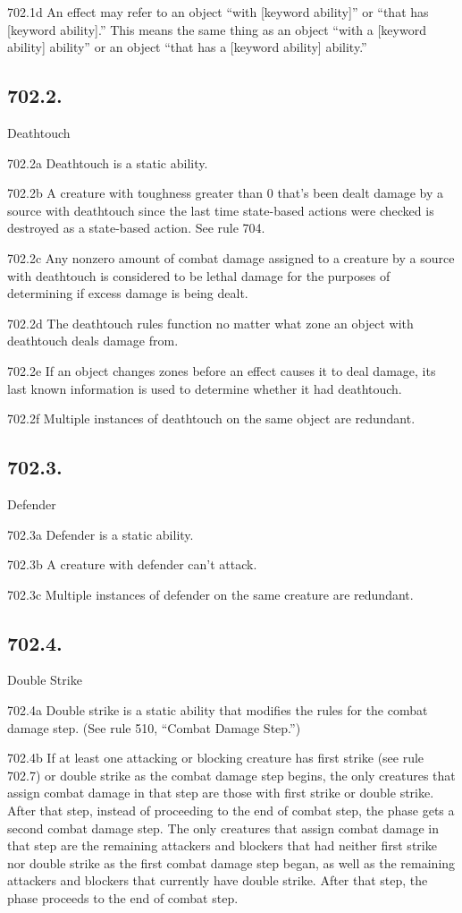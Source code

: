 702.1d An effect may refer to an object “with [keyword ability]” or “that has [keyword ability].” This means the same thing as an object “with a [keyword ability] ability” or an object “that has a [keyword ability] ability.”

\subsection*{702.2.}
Deathtouch

702.2a Deathtouch is a static ability.

702.2b A creature with toughness greater than 0 that’s been dealt damage by a source with deathtouch since the last time state-based actions were checked is destroyed as a state-based action. See rule 704.

702.2c Any nonzero amount of combat damage assigned to a creature by a source with deathtouch is considered to be lethal damage for the purposes of determining if excess damage is being dealt.

702.2d The deathtouch rules function no matter what zone an object with deathtouch deals damage from.

702.2e If an object changes zones before an effect causes it to deal damage, its last known information is used to determine whether it had deathtouch.

702.2f Multiple instances of deathtouch on the same object are redundant.

\subsection*{702.3.}
Defender

702.3a Defender is a static ability.

702.3b A creature with defender can’t attack.

702.3c Multiple instances of defender on the same creature are redundant.

\subsection*{702.4.}
Double Strike

702.4a Double strike is a static ability that modifies the rules for the combat damage step. (See rule 510, “Combat Damage Step.”)

702.4b If at least one attacking or blocking creature has first strike (see rule 702.7) or double strike as the combat damage step begins, the only creatures that assign combat damage in that step are those with first strike or double strike. After that step, instead of proceeding to the end of combat step, the phase gets a second combat damage step. The only creatures that assign combat damage in that step are the remaining attackers and blockers that had neither first strike nor double strike as the first combat damage step began, as well as the remaining attackers and blockers that currently have double strike. After that step, the phase proceeds to the end of combat step.

